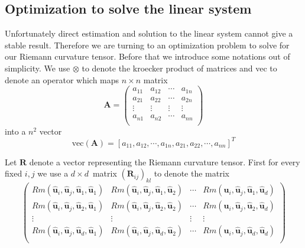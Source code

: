 \documentclass{article}
\begin{document}
\subsection{Optimization to solve the linear system}
Unfortunately direct estimation and solution to the linear system cannot give a stable result. Therefore we are turning to an optimization problem to solve for our Riemann curvature tensor. Before that we introduce some notations out of simplicity. We use $\otimes$ to denote the kroecker product of matrices and vec to denote an operator which maps $n\times n$ matrix
\[
\boldsymbol{A} = 
\begin{pmatrix}
a_{11} & a_{12} & \cdots & a_{1n} \\
a_{21} & a_{22} & \cdots & a_{2n} \\
\vdots & \vdots & \vdots & \vdots \\
a_{n1} & a_{n2} & \cdots & a_{nn} \\
\end{pmatrix}
\]
into a $n^2$ vector
\begin{equation}
\text{vec}(\boldsymbol{A})=[a_{11},a_{12},\cdots,a_{1n},a_{21},a_{22},\cdots,a_{nn}]^T
\end{equation}
\par
 Let $\boldsymbol{R}$ denote a vector representing the Riemann curvature tensor. First for every fixed $i,j$ we use a $d\times d$\ matrix $(\boldsymbol{R}_{ij})_{kl}$ to denote the matrix
\begin{equation}
	\begin{pmatrix}
	Rm(\widehat{\boldsymbol{u}}_i,\widehat{\boldsymbol{u}}_j,\widehat{\boldsymbol{u}}_1,\widehat{\boldsymbol{u}}_1) & Rm(\widehat{\boldsymbol{u}}_i,\widehat{\boldsymbol{u}}_j,\widehat{\boldsymbol{u}}_1,\widehat{\boldsymbol{u}}_2) &\cdots& Rm(\widehat{\boldsymbol{u}}_i,\widehat{\boldsymbol{u}}_j,\widehat{\boldsymbol{u}}_1,\widehat{\boldsymbol{u}}_d) \\
	Rm(\widehat{\boldsymbol{u}}_i,\widehat{\boldsymbol{u}}_j,\widehat{\boldsymbol{u}}_2,\widehat{\boldsymbol{u}}_1) & Rm(\widehat{\boldsymbol{u}}_i,\widehat{\boldsymbol{u}}_j,\widehat{\boldsymbol{u}}_2,\widehat{\boldsymbol{u}}_2) &\cdots &Rm(\widehat{\boldsymbol{u}}_i,\widehat{\boldsymbol{u}}_j,\widehat{\boldsymbol{u}}_2,\widehat{\boldsymbol{u}}_d) \\
	\vdots & \vdots & \vdots & \vdots \\
	Rm(\widehat{\boldsymbol{u}}_i,\widehat{\boldsymbol{u}}_j,\widehat{\boldsymbol{u}}_d,\widehat{\boldsymbol{u}}_1) & Rm(\widehat{\boldsymbol{u}}_i,\widehat{\boldsymbol{u}}_j,\widehat{\boldsymbol{u}}_d,\widehat{\boldsymbol{u}}_2) &\cdots& Rm(\widehat{\boldsymbol{u}}_i,\widehat{\boldsymbol{u}}_j,\widehat{\boldsymbol{u}}_d,\widehat{\boldsymbol{u}}_d) \\
	\end{pmatrix}
\end{equation}
\end{document}
